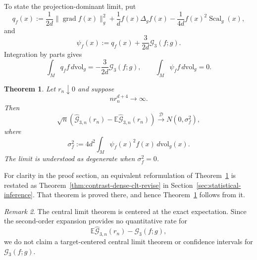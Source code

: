 \documentclass[11pt]{article}
\newtheorem{theorem}{Theorem}[section]
\theoremstyle{remark}
\newtheorem{remark}[theorem]{Remark}
\newcommand{\Scal}{\operatorname{Scal}}
\newcommand{\grad}{\operatorname{grad}}
\newcommand{\E}{\mathbb E}
\numberwithin{equation}{section}
\begin{document}
To state the projection-dominant limit, put
\begin{equation}
q_f(x):=
\frac{1}{2d}\|\grad f(x)\|_g^2
+\frac1d f(x)\Delta_gf(x)
-\frac{1}{4d}f(x)^2\Scal_g(x),
\label{eq:qf-definition}
\end{equation}
and
\begin{equation}
\psi_f(x)
:=q_f(x)+\frac{3}{2d}\mathcal G_3(f;g).
\label{eq:psi-f-definition}
\end{equation}
Integration by parts gives
\[
\int_M q_f f\,d\mathrm{vol}_g
=-\frac{3}{2d}\mathcal G_3(f;g),
\qquad
\int_M\psi_f f\,d\mathrm{vol}_g=0.
\]

\begin{theorem}
\label{thm:contrast-dense-clt}
Let $r_n\downarrow0$ and suppose
\begin{equation}
n r_n^{d+4}\rightarrow\infty.
\label{eq:dense-bandwidth-condition}
\end{equation}
Then
\begin{equation}
\sqrt n\left(
\widehat{\mathcal G}_{3,n}(r_n)
-\E\widehat{\mathcal G}_{3,n}(r_n)
\right)
\xrightarrow{\mathcal D}
N(0,\sigma_f^2),
\label{eq:G3-dense-clt}
\end{equation}
where
\begin{equation}
\sigma_f^2
:=4d^2\int_M\psi_f(x)^2f(x)\,d\mathrm{vol}_g(x).
\label{eq:G3-asymptotic-variance}
\end{equation}
The limit is understood as degenerate when $\sigma_f^2=0$.
\end{theorem}

For clarity in the proof section, an equivalent reformulation of
Theorem~\ref{thm:contrast-dense-clt} is restated as
Theorem~\ref{thm:contrast-dense-clt-revise} in
Section~\ref{sec:statistical-inference}.  That theorem is proved there,
and hence Theorem~\ref{thm:contrast-dense-clt} follows from it.

\begin{remark}
The central limit theorem is centered at the exact expectation.
Since the second-order expansion provides no quantitative rate for
\[
\E\widehat{\mathcal G}_{3,n}(r_n)-\mathcal G_3(f;g),
\]
we do not claim a target-centered central limit theorem or confidence
intervals for $\mathcal G_3(f;g)$.
\end{remark}
\end{document}
